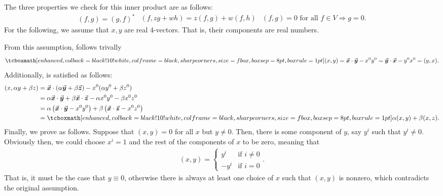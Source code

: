 
The three properties we check for this inner product are as follows:
\begin{subequations} 
\begin{eqnarray}
    \label{eq:prop-1}
    (f,g) = (g,f)^{*}
\end{eqnarray}
\begin{eqnarray}
    \label{eq:prop-2}
    (f,zg+wh) = z(f,g) + w(f,h)
\end{eqnarray}
\begin{eqnarray}
    \label{eq:prop-3}
    (f,g) = 0 \mbox{ for all } f \in V \Rightarrow g = 0
.\end{eqnarray}
\end{subequations}
For the following, we assume that $x,y$ are real 4-vectors.
That is, their components are real numbers.

From this assumption,  follows trivally
\begin{eqnarray}
    \label{eq:prop-1-mink}
    \eqbox{
    (x,y) = \va*{x} \cdot \va*{y} - x^{0}y^{0} = \va*{y} \cdot \va*{x} - y^{0}x^{0} = (y,x) 
    }
.\end{eqnarray}
Additionally,  is satisfied as follows:
\begin{align}
    \label{eq:prop-2-mink}
    (x,\alpha y + \beta z) &= \va*{x} \cdot (\alpha \va*{y} + \beta \va*{z}) - x^{0}(\alpha y^{0} + \beta z^{0}) \notag \\
                           &= \alpha \va*{x} \cdot \va*{y} + \beta \va*{x} \cdot \va*{z} - \alpha x^{0}y^{0} - \beta x^{0}z^{0} \notag \\
                           &= \alpha \left( \va*{x} \cdot \va*{y} - x^{0}y^{0} \right) + \beta \left( \va*{x} \cdot \va*{z} - x^{0} z^{0} \right) \notag \\
                           &= \eqbox{\alpha (x,y) + \beta (x,z)}
.\end{align}
Finally, we prove  as follows.
Suppose that $(x,y) = 0$ for all $x$ but $y \ne 0$.
Then, there is some component of $y$, say $y^{i}$ such that $y^{i} \ne 0$.
Obviously then, we could choose $x^{i} = 1$ and the rest of the components of $x$ to be zero, meaning that 
\begin{eqnarray}
    \label{eq:prod-3-mink}
    (x,y) = \begin{cases}
        y^{i} & \mbox{if } i \ne 0 \\
        -y^{i} & \mbox{if } i = 0
    \end{cases}
.\end{eqnarray}
That is, it must be the case that $y \equiv 0$, otherwise there is always at least one choice of $x$ such that $(x,y)$ is nonzero, which contradicts the original assumption.


